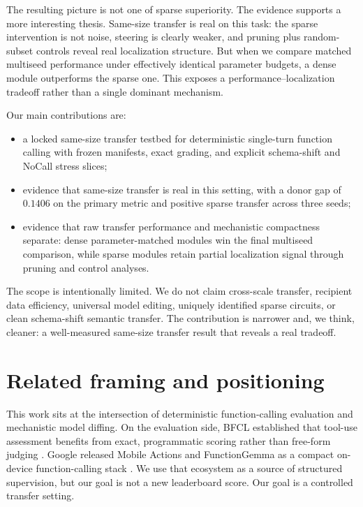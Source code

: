 \documentclass{article}
\begin{document}
The resulting picture is not one of sparse superiority. The evidence supports a more interesting thesis. Same-size transfer is real on this task: the sparse intervention is not noise, steering is clearly weaker, and pruning plus random-subset controls reveal real localization structure. But when we compare matched multiseed performance under effectively identical parameter budgets, a dense module outperforms the sparse one. This exposes a performance--localization tradeoff rather than a single dominant mechanism.

Our main contributions are:
\begin{itemize}
  \item a locked same-size transfer testbed for deterministic single-turn function calling with frozen manifests, exact grading, and explicit schema-shift and NoCall stress slices;
  \item evidence that same-size transfer is real in this setting, with a donor gap of $0.1406$ on the primary metric and positive sparse transfer across three seeds;
  \item evidence that raw transfer performance and mechanistic compactness separate: dense parameter-matched modules win the final multiseed comparison, while sparse modules retain partial localization signal through pruning and control analyses.
\end{itemize}

The scope is intentionally limited. We do not claim cross-scale transfer, recipient data efficiency, universal model editing, uniquely identified sparse circuits, or clean schema-shift semantic transfer. The contribution is narrower and, we think, cleaner: a well-measured same-size transfer result that reveals a real tradeoff.

\section{Related framing and positioning}
This work sits at the intersection of deterministic function-calling evaluation and mechanistic model diffing. On the evaluation side, BFCL established that tool-use assessment benefits from exact, programmatic scoring rather than free-form judging \citep{patil2025bfcl}. Google released Mobile Actions and FunctionGemma as a compact on-device function-calling stack \citep{google2025mobileactions}. We use that ecosystem as a source of structured supervision, but our goal is not a new leaderboard score. Our goal is a controlled transfer setting.
\end{document}
